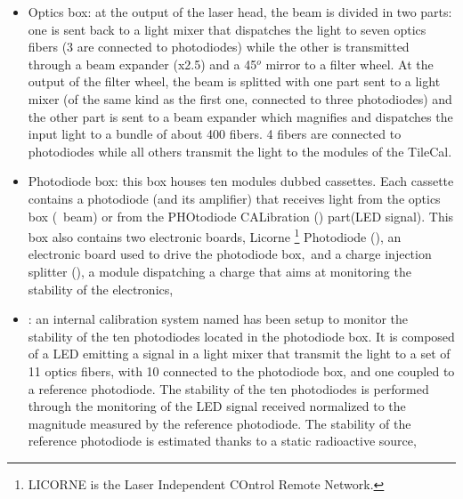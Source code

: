\begin{itemize}
\item Optics box: at the output of the laser head, the beam is divided in two parts: one 
is sent back to a light mixer that dispatches the light to seven optics fibers (3 are connected to photodiodes) while the other is transmitted through a beam expander (x2.5) and a 45$^{o}$ mirror to a filter wheel. At the output of the filter wheel, the beam is splitted with one part sent to a light mixer (of the same kind as the first one, connected to three photodiodes) and the other part is sent to a beam expander which magnifies and dispatches the input light to a bundle of about 400 fibers. 4 fibers are connected to photodiodes while all others transmit the light to the modules of the TileCal.


\item Photodiode box: this box houses ten modules dubbed cassettes. Each cassette contains a photodiode (and its amplifier) that receives light from the optics box (\laser~beam) or from the PHOtodiode CALibration (\phocal) part(LED signal). This box also contains two electronic boards, Licorne \footnote{LICORNE is the Laser Independent COntrol Remote Network.} Photodiode (\licphd), an electronic board used to drive the photodiode box,~and a charge injection splitter (\charinjsplit), a module dispatching a charge that aims at monitoring the stability of the electronics,

\item \phocal: an internal calibration system named has been setup to monitor the stability of the ten photodiodes located in the photodiode box. It is composed of a LED emitting a signal in a light mixer that transmit the light to a set of 11 optics fibers, with 10 connected to the photodiode box, and one coupled to a reference photodiode. 
The stability of the ten photodiodes is performed through the monitoring of the LED signal received normalized to the magnitude measured by the reference photodiode. The stability of the reference photodiode is estimated thanks to a static radioactive source,


\end{itemize}
